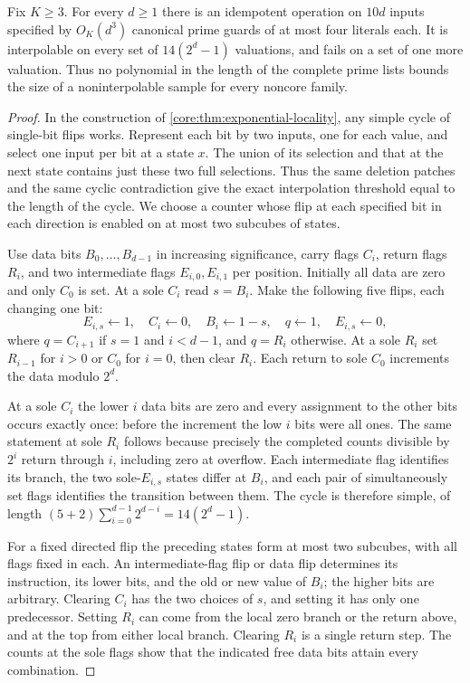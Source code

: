 \begin{theorem}
\label{core:thm:compact-prime-locality}
Fix $K\ge3$. For every $d\ge1$ there is an idempotent operation
on $10d$ inputs specified by $O_K(d^3)$ canonical prime guards of
at most four literals each. It is interpolable on every set of
$14(2^d-1)$ valuations, and fails on a set of one more valuation.
Thus no polynomial in the length of the complete prime lists bounds
the size of a noninterpolable sample for every noncore family.
\end{theorem}
\begin{proof}
In the construction of \cref{core:thm:exponential-locality}, any
simple cycle of single-bit flips works. Represent each bit by two
inputs, one for each value, and select one input per bit at a state
$x$. The union of its selection and that at the next state contains
just these two full selections. Thus the same deletion patches and
the same cyclic contradiction give the exact interpolation threshold
equal to the length of the cycle. We choose a counter whose flip
at each specified bit in each direction is enabled on at most two
subcubes of states.

Use data bits $B_0,\ldots,B_{d-1}$ in increasing significance,
carry flags $C_i$, return flags $R_i$, and two intermediate flags
$E_{i,0},E_{i,1}$ per position. Initially all data are zero and
only $C_0$ is set. At a sole $C_i$ read $s=B_i$. Make the following
five flips, each changing one bit:
\[
 E_{i,s}\gets1,\quad C_i\gets0,\quad B_i\gets1-s,\quad
 q\gets1,\quad E_{i,s}\gets0 ,
\]
where $q=C_{i+1}$ if $s=1$ and $i<d-1$, and $q=R_i$ otherwise.
At a sole $R_i$ set $R_{i-1}$ for $i>0$ or $C_0$ for $i=0$,
then clear $R_i$. Each return to sole $C_0$ increments the data
modulo $2^d$.

At a sole $C_i$ the lower $i$ data bits are zero and every assignment
to the other bits occurs exactly once: before the increment the low
$i$ bits were all ones. The same statement at sole $R_i$ follows
because precisely the completed counts divisible by $2^i$ return
through $i$, including zero at overflow. Each intermediate flag
identifies its branch, the two sole-$E_{i,s}$ states differ at
$B_i$, and each pair of simultaneously set flags identifies the
transition between them. The cycle is therefore simple, of length
$(5+2)\sum_{i=0}^{d-1}2^{d-i}=14(2^d-1)$.

For a fixed directed flip the preceding states form at most two
subcubes, with all flags fixed in each. An intermediate-flag flip
or data flip determines its instruction, its lower bits, and the
old or new value of $B_i$; the higher bits are arbitrary. Clearing
$C_i$ has the two choices of $s$, and setting it has only one
predecessor. Setting $R_i$ can come from the local zero branch or
the return above, and at the top from either local branch.
Clearing $R_i$ is a single return step. The counts at the sole
flags show that the indicated free data bits attain every
combination.


\end{proof}
